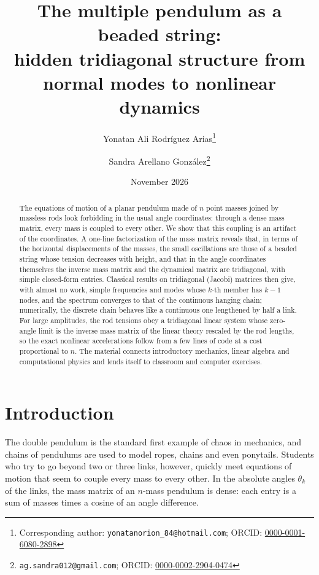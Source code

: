 \documentclass[11pt]{article}
\title{The multiple pendulum as a beaded string:\\ hidden tridiagonal structure from normal modes to nonlinear dynamics}
\author[1]{Yonatan Ali Rodr\'iguez Arias\thanks{Corresponding author: \texttt{yonatanorion\_84@hotmail.com}; ORCID: \href{https://orcid.org/0000-0001-6080-2898}{0000-0001-6080-2898}}}
\author[1]{Sandra Arellano Gonz\'alez\thanks{\texttt{ag.sandra012@gmail.com}; ORCID: \href{https://orcid.org/0000-0002-2904-0474}{0000-0002-2904-0474}}}
\affil[1]{Instituto Polit\'ecnico Nacional, Escuela Superior de Ingenier\'ia Mec\'anica y El\'ectrica (ESIME) Unidad Zacatenco, Ciudad de M\'exico 07738, Mexico}
\date{November 2026}
\begin{document}
\maketitle

\begin{abstract}
\noindent The equations of motion of a planar pendulum made of $n$ point masses joined by massless rods look forbidding in the usual angle coordinates: through a dense mass matrix, every mass is coupled to every other. We show that this coupling is an artifact of the coordinates. A one-line factorization of the mass matrix reveals that, in terms of the horizontal displacements of the masses, the small oscillations are those of a beaded string whose tension decreases with height, and that in the angle coordinates themselves the inverse mass matrix and the dynamical matrix are tridiagonal, with simple closed-form entries. Classical results on tridiagonal (Jacobi) matrices then give, with almost no work, simple frequencies and modes whose $k$-th member has $k-1$ nodes, and the spectrum converges to that of the continuous hanging chain; numerically, the discrete chain behaves like a continuous one lengthened by half a link. For large amplitudes, the rod tensions obey a tridiagonal linear system whose zero-angle limit is the inverse mass matrix of the linear theory rescaled by the rod lengths, so the exact nonlinear accelerations follow from a few lines of code at a cost proportional to $n$. The material connects introductory mechanics, linear algebra and computational physics and lends itself to classroom and computer exercises.
\end{abstract}

\section{Introduction}

The double pendulum is the standard first example of chaos in mechanics, and chains of pendulums are used to model ropes, chains and even ponytails.\cite{fritzkowski2008dynamics,tomaszewski2005dynamics,plaut2013pendulum} Students who try to go beyond two or three links, however, quickly meet equations of motion that seem to couple every mass to every other. In the absolute angles $\theta_k$ of the links, the mass matrix of an $n$-mass pendulum is dense: each entry is a sum of masses times a cosine of an angle difference.\cite{yesilyurt2019equations,charles2019lagrangian,konishi2023multiple,bondada2023dynamics}
\end{document}
